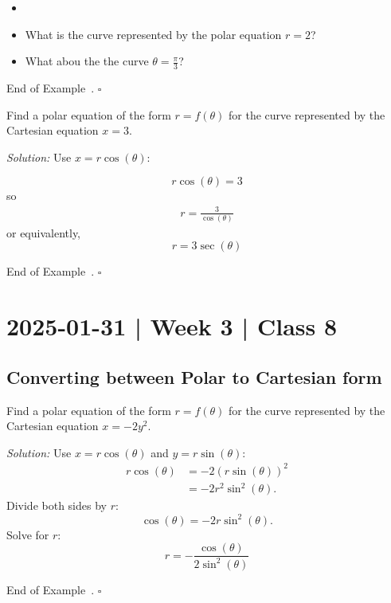 \documentclass[10pt]{article}
\theoremstyle{definition}
\newtheorem{example}[theorem]{Example}
\renewenvironment{example}
{\begin{oldexample}}
  {\par\smallskip\hfill   End of Example~\theexample. $\square$    \par\end{oldexample}}
\newcommand{\Fli}{\vskip 2mm\noindent\textit} %
\newcommand{\1}[1]{\textbf{1}_{\left[#1\right]}} %
\begin{document}
\begin{example}
  \begin{itemize}
    \item []
    \item What is the curve represented by the polar equation $r=2$?
    \item What abou the the curve $\theta = \frac{\pi}{3}$?
  \end{itemize}
\end{example}
\begin{example}
  Find a polar equation of the form $r=f(\theta)$ for the
  curve represented by the Cartesian equation $x=3$.

  \Fli{Solution:} Use $x=r\cos(\theta)$:

  \begin{equation*}
    r\cos(\theta) = 3
  \end{equation*}
  so
  \begin{align*}
    r = \frac{3}{\cos(\theta)} 
  \end{align*}
  or equivalently,
  \begin{equation*}
    r = 3\sec(\theta)
  \end{equation*}
\end{example}

\newpage

\newpage
\section{2025-01-31 | Week 3 | Class 8}

\subsection{Converting between Polar to Cartesian form}
\begin{example}[Cartesian $\implies$ Polar ]
  Find a polar equation of the form $r = f(\theta)$ for the
  curve represented by the Cartesian equation $x=-2y^{2}$.

  \Fli{Solution:} Use
  $x=r\cos(\theta)$ and $y=r\sin(\theta)$:
  \begin{align*}
    r\cos(\theta) 
    &= -2 \left( r\sin(\theta) \right)^{2}\\
    &= -2 r^{2}\sin^{2}(\theta).
  \end{align*}
  Divide both sides by $r$:
  \begin{equation*}
    \cos(\theta) = -2r \sin^{2}(\theta).
  \end{equation*}
  Solve for $r$:
  \begin{equation*}
    r = -\frac{\cos(\theta)}{2\sin^{2}(\theta)}
  \end{equation*}
\end{example}
\end{document}
